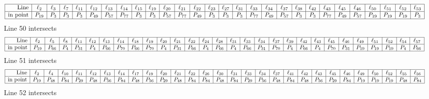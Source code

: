 \documentclass{article}
\begin{document}
{$$
\begin{array}{|r*{27}{|c}|}
\hline
\mbox{Line}  & \ell_{2} & \ell_{3} & \ell_{7} & \ell_{11} & \ell_{12} & \ell_{13} & \ell_{14} & \ell_{15} & \ell_{19} & \ell_{20} & \ell_{21} & \ell_{22} & \ell_{23} & \ell_{27} & \ell_{31} & \ell_{33} & \ell_{34} & \ell_{37} & \ell_{38} & \ell_{42} & \ell_{43} & \ell_{45} & \ell_{46} & \ell_{50} & \ell_{51} & \ell_{52} & \ell_{53}\\
\hline
\mbox{in point}  & P_{19} & P_{3} & P_{3} & P_{3} & P_{49} & P_{57} & P_{77} & P_{3} & P_{3} & P_{57} & P_{77} & P_{49} & P_{3} & P_{3} & P_{3} & P_{77} & P_{49} & P_{57} & P_{3} & P_{3} & P_{77} & P_{49} & P_{57} & P_{19} & P_{19} & P_{19} & P_{3}\\
\hline
\end{array}
$$
Line 50 intersects 
$$
\begin{array}{|r*{28}{|c}|}
\hline
\mbox{Line}  & \ell_{2} & \ell_{5} & \ell_{8} & \ell_{11} & \ell_{12} & \ell_{13} & \ell_{14} & \ell_{18} & \ell_{19} & \ell_{20} & \ell_{21} & \ell_{22} & \ell_{24} & \ell_{28} & \ell_{31} & \ell_{33} & \ell_{34} & \ell_{37} & \ell_{39} & \ell_{42} & \ell_{43} & \ell_{45} & \ell_{46} & \ell_{49} & \ell_{51} & \ell_{52} & \ell_{54} & \ell_{57}\\
\hline
\mbox{in point}  & P_{19} & P_{66} & P_{4} & P_{31} & P_{4} & P_{66} & P_{70} & P_{66} & P_{70} & P_{4} & P_{31} & P_{66} & P_{4} & P_{66} & P_{4} & P_{66} & P_{31} & P_{70} & P_{4} & P_{66} & P_{4} & P_{70} & P_{31} & P_{19} & P_{19} & P_{19} & P_{4} & P_{66}\\
\hline
\end{array}
$$
Line 51 intersects 
$$
\begin{array}{|r*{28}{|c}|}
\hline
\mbox{Line}  & \ell_{2} & \ell_{4} & \ell_{10} & \ell_{11} & \ell_{12} & \ell_{13} & \ell_{14} & \ell_{17} & \ell_{19} & \ell_{20} & \ell_{21} & \ell_{22} & \ell_{26} & \ell_{30} & \ell_{31} & \ell_{33} & \ell_{34} & \ell_{37} & \ell_{41} & \ell_{42} & \ell_{43} & \ell_{45} & \ell_{46} & \ell_{49} & \ell_{50} & \ell_{52} & \ell_{55} & \ell_{56}\\
\hline
\mbox{in point}  & P_{19} & P_{48} & P_{84} & P_{29} & P_{48} & P_{56} & P_{84} & P_{48} & P_{56} & P_{29} & P_{48} & P_{84} & P_{84} & P_{48} & P_{84} & P_{29} & P_{56} & P_{48} & P_{84} & P_{48} & P_{56} & P_{29} & P_{84} & P_{19} & P_{19} & P_{19} & P_{48} & P_{84}\\
\hline
\end{array}
$$
Line 52 intersects 
$$
\begin{array}{|r*{28}{|c}|}

\end{array}$$}
\end{document}
